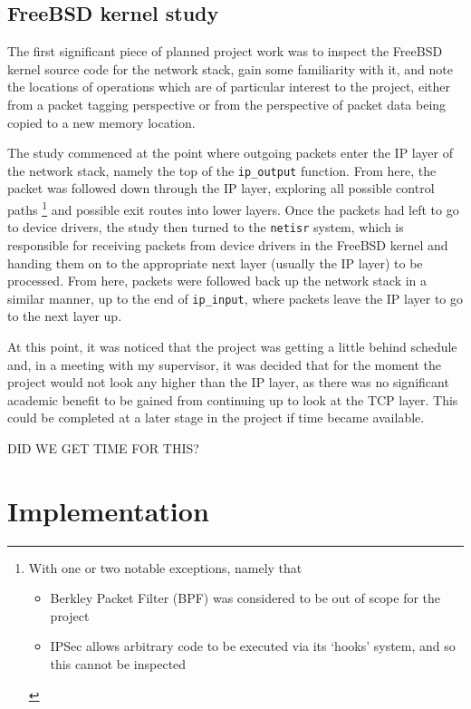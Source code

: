 \documentclass[a4paper,12pt,twoside,openright]{report}
\begin{document}
	\section{FreeBSD kernel study}
	
	The first significant piece of planned project work was to inspect the FreeBSD kernel source code for the network stack, gain some familiarity with it, and note the locations of operations which are of particular interest to the project, either from a packet tagging perspective or from the perspective of packet data being copied to a new memory location.
	
	The study commenced at the point where outgoing packets enter the IP layer of the network stack, namely the top of the \verb|ip_output| function. From here, the packet was followed down through the IP layer, exploring all possible control paths
	\footnote{
		With one or two notable exceptions, namely that
		\begin{itemize}
			\item Berkley Packet Filter (BPF) was considered to be out of scope for the project
			\item IPSec allows arbitrary code to be executed via its `hooks' system, and so this cannot be inspected
		\end{itemize}
	}
	and possible exit routes into lower layers. Once the packets had left to go to device drivers, the study then turned to the \texttt{netisr} system, which is responsible for receiving packets from device drivers in the FreeBSD kernel and handing them on to the appropriate next layer (usually the IP layer) to be processed. From here, packets were followed back up the network stack in a similar manner, up to the end of \verb|ip_input|, where packets leave the IP layer to go to the next layer up.
	
	At this point, it was noticed that the project was getting a little behind schedule and, in a meeting with my supervisor, it was decided that for the moment the project would not look any higher than the IP layer, as there was no significant academic benefit to be gained from continuing up to look at the TCP layer. This could be completed at a later stage in the project if time became available.
	
	DID WE GET TIME FOR THIS?
	
	
	\chapter{Implementation}
	
\end{document}
